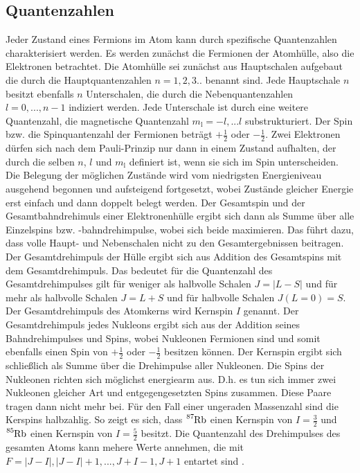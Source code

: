\subsection{Quantenzahlen}

Jeder Zustand eines Fermions im Atom kann durch spezifische Quantenzahlen 
charakterisiert werden. Es werden zunächst die Fermionen der Atomhülle, also die 
Elektronen betrachtet. Die Atomhülle sei zunächst aus Hauptschalen aufgebaut die 
durch die Hauptquantenzahlen $n = 1,2,3..$ benannt sind. Jede Hauptschale $n$ besitzt 
ebenfalls $n$  Unterschalen, die durch die Nebenquantenzahlen $l = 0,...,n-1$ 
indiziert werden. Jede Unterschale ist durch eine weitere Quantenzahl, 
die magnetische Quantenzahl $m_{\text{l}}=-l,...l$ substrukturiert. 
Der Spin bzw. die Spinquantenzahl der Fermionen beträgt $+\frac{1}{2}$ oder 
$-\frac{1}{2}$.
Zwei Elektronen dürfen sich nach dem Pauli-Prinzip nur dann in einem Zustand aufhalten, 
der durch die selben $n$, $l$ und $m_{\text{l}}$ definiert ist, wenn sie sich im 
Spin unterscheiden. Die Belegung der möglichen Zustände wird vom niedrigsten Energieniveau 
ausgehend begonnen und aufsteigend fortgesetzt, wobei Zustände gleicher Energie erst einfach 
und dann doppelt belegt werden.
Der Gesamtspin und der Gesamtbahndrehimuls einer Elektronenhülle ergibt sich dann 
als Summe über alle Einzelspins bzw. -bahndrehimpulse, wobei sich beide maximieren.
Das führt dazu, dass volle Haupt- und Nebenschalen nicht zu den Gesamtergebnissen 
beitragen. Der Gesamtdrehimpuls der Hülle ergibt sich aus Addition des Gesamtspins mit 
dem Gesamtdrehimpuls. Das bedeutet für die Quantenzahl des Gesamtdrehimpulses gilt 
für weniger als halbvolle Schalen $J = |L-S|$ und für mehr als halbvolle Schalen 
$J = L+S$ und für halbvolle Schalen $J(L=0) = S$. 
Der Gesamtdrehimpuls des Atomkerns wird Kernspin $I$ genannt. Der Gesamtdrehimpuls 
jedes Nukleons ergibt sich aus der Addition seines Bahndrehimpulses und Spins, 
wobei Nukleonen Fermionen sind und somit ebenfalls einen Spin von  $+\frac{1}{2}$ oder 
$-\frac{1}{2}$ besitzen können. Der Kernspin ergibt sich schließlich als Summe über die 
Drehimpulse aller Nukleonen. Die Spins der Nukleonen richten sich möglichst energiearm 
aus. D.h. es tun sich immer zwei Nukleonen gleicher Art und entgegengesetzten Spins 
zusammen. Diese Paare tragen dann nicht mehr bei. Für den Fall einer ungeraden Massenzahl 
sind die Kerspins halbzahlig. So zeigt es sich, dass
$\ce{^87Rb}$ einen Kernspin von $I = \frac{3}{2}$ und  $\ce{^85Rb}$ einen Kernspin von 
$I = \frac{5}{2}$ besitzt.
Die Quantenzahl des Drehimpulses des gesamten Atoms kann mehere Werte annehmen, die mit
$F = |J-I|, |J-I|+1,..., J+I -1, J+1$ entartet sind \cite{1}. 

